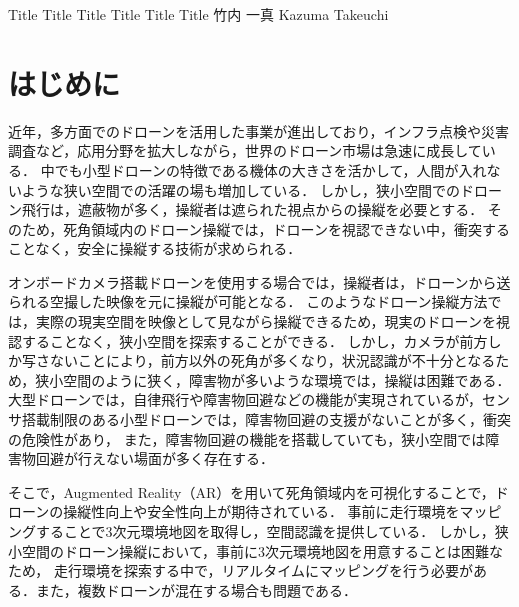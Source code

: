 \documentclass[a4paper,10pt,twocolumn,uplatex]{jsarticle}
\date{11}
\begin{document}
{Title Title Title Title Title Title}
{竹内 一真}
{Kazuma Takeuchi}


\section{はじめに}
近年，多方面でのドローンを活用した事業が進出しており，インフラ点検や災害調査など，応用分野を拡大しながら，世界のドローン市場は急速に成長している\cite{Nonami}．
中でも小型ドローンの特徴である機体の大きさを活かして，人間が入れないような狭い空間での活躍の場も増加している．
しかし，狭小空間でのドローン飛行は，遮蔽物が多く，操縦者は遮られた視点からの操縦を必要とする．
そのため，死角領域内のドローン操縦では，ドローンを視認できない中，衝突することなく，安全に操縦する技術が求められる．
\par
オンボードカメラ搭載ドローンを使用する場合では，操縦者は，ドローンから送られる空撮した映像を元に操縦が可能となる．
このようなドローン操縦方法では，実際の現実空間を映像として見ながら操縦できるため，現実のドローンを視認することなく，狭小空間を探索することができる．
しかし，カメラが前方しか写さないことにより，前方以外の死角が多くなり，状況認識が不十分となるため\cite{Green}，狭小空間のように狭く，障害物が多いような環境では，操縦は困難である．
大型ドローンでは，自律飛行や障害物回避などの機能が実現されているが，センサ搭載制限のある小型ドローンでは，障害物回避の支援がないことが多く，衝突の危険性があり，
また，障害物回避の機能を搭載していても，狭小空間では障害物回避が行えない場面が多く存在する\cite{syohou}．
\par
そこで，Augmented Reality（AR）を用いて死角領域内を可視化することで，ドローンの操縦性向上や安全性向上が期待されている\cite{Erat}．
事前に走行環境をマッピングすることで3次元環境地図を取得し，空間認識を提供している．
しかし，狭小空間のドローン操縦において，事前に3次元環境地図を用意することは困難なため，
走行環境を探索する中で，リアルタイムにマッピングを行う必要がある．また，複数ドローンが混在する場合も問題である．
\end{document}
